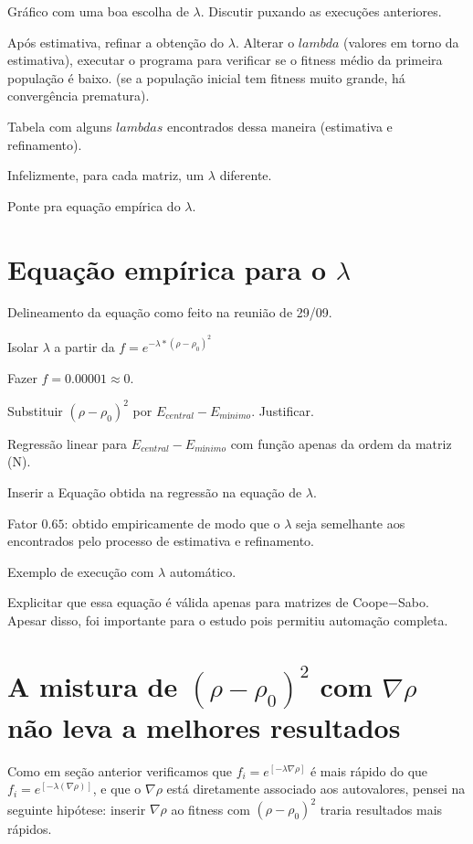 	Gráfico com uma boa escolha de $\lambda$. Discutir puxando as execuções anteriores.
	
	Após estimativa, refinar a obtenção do $\lambda$. Alterar o $lambda$ (valores em torno da estimativa), executar o programa para verificar se o fitness médio da primeira população é baixo. (se a população inicial tem fitness muito grande, há convergência prematura).
	
	Tabela com alguns $lambdas$ encontrados dessa maneira (estimativa e refinamento).
	
	Infelizmente, para cada matriz, um $\lambda$ diferente.
	
	Ponte pra equação empírica do $\lambda$.
	
	\section{Equação empírica para o $\lambda$}
	
	Delineamento da equação como feito na reunião de 29/09.
	
	Isolar $\lambda$ a partir da $f=e^{-\lambda*(\rho - \rho_0)^2}$
	
	Fazer $f = 0.00001 \approx 0$.
	
	Substituir $(\rho - \rho_0)^2$ por $E_{central} - E_{mínimo}$. Justificar.
	
	Regressão linear para $E_{central} - E_{mínimo}$ com função apenas da ordem da matriz (N).
	
	Inserir a Equação obtida na regressão na equação de $\lambda$.
	
	Fator $0.65$: obtido empiricamente de modo que o $\lambda$ seja semelhante aos encontrados pelo processo de estimativa e refinamento.
	
	Exemplo de execução com $\lambda$ automático.
	
	Explicitar que essa equação é válida apenas para matrizes de Coope$-$Sabo. Apesar disso, foi importante para o estudo pois permitiu automação completa.
		
	\section{A mistura de $(\rho - \rho_0)^2$ com $\nabla\rho$ não leva a melhores resultados}
	
	Como em seção anterior verificamos que $f_i = e^{[-\lambda \nabla \rho]}$ é mais rápido do que $f_i = e^{[-\lambda (\nabla \rho)]}$, e que o $\nabla\rho$ está diretamente associado aos autovalores, pensei na seguinte hipótese: inserir $\nabla \rho$ ao fitness com $(\rho - \rho_0)^2$ traria resultados mais rápidos.
	
